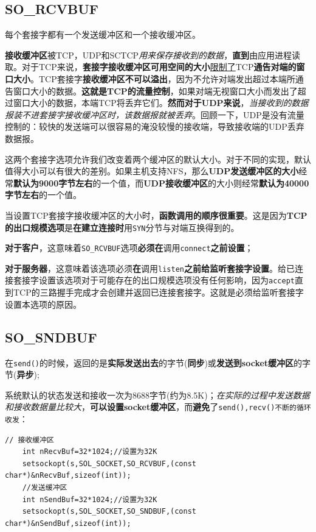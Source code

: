 \documentclass[UTF8,a4paper,8pt]{ctexbook}
\begin{document}
		\subsection{SO\_RCVBUF}
			每个套接字都有一个发送缓冲区和一个接收缓冲区。
			
			\textbf{接收缓冲区}被TCP，UDP和SCTCP\textit{用来保存接收到的数据}，\textbf{直到}由应用进程读取。对于TCP来说，\textbf{套接字接收缓冲区可用空间的大小}\underline{限制了}TCP\textbf{通告对端的窗口大小}。TCP套接字\textbf{接收缓冲区不可以溢出}，因为不允许对端发出超过本端所通告窗口大小的数据。\textbf{这就是TCP的流量控制}，如果对端无视窗口大小而发出了超过窗口大小的数据，本端TCP将丢弃它们。\textbf{然而对于UDP来说}，\textit{当接收到的数据报装不进套接字接收缓冲区时，该数据报就被丢弃}。回顾一下，UDP是没有流量控制的：较快的发送端可以很容易的淹没较慢的接收端，导致接收端的UDP丢弃数据报。
			
			这两个套接字选项允许我们改变着两个缓冲区的默认大小。对于不同的实现，默认值得大小可以有很大的差别。如果主机支持NFS，那么\textbf{UDP发送缓冲区的大小}经常\textbf{默认为9000字节左右}的一个值，而\textbf{UDP接收缓冲区}的大小则经常\textbf{默认为40000字节左右}的一个值。
			
			当设置TCP套接字接收缓冲区的大小时，\textbf{函数调用的顺序很重要}。这是因为\textbf{TCP的出口规模选项}是\textbf{在建立连接时}用\verb|SYN|分节与对端互换得到的。
			
			\textbf{对于客户}，这意味着\verb|SO_RCVBUF|选项\textbf{必须在}调用\verb|connect|\textbf{之前设置}；
			
			\textbf{对于服务器}，这意味着该选项必须\textbf{在}调用\verb|listen|\textbf{之前给监听套接字设置}。给已连接套接字设置该选项对于可能存在的出口规模选项没有任何影响，因为\verb|accept|直到TCP的三路握手完成才会创建并返回已连接套接字。这就是必须给监听套接字设置本选项的原因。
			
		\subsection{SO\_SNDBUF}
			在\verb|send()|的时候，返回的是\textbf{实际发送出去}的字节(\textbf{同步})或\textbf{发送到socket缓冲区}的字节(\textbf{异步});
			
			系统默认的状态发送和接收一次为8688字节(约为8.5K)；\textit{在实际的过程中发送数据和接收数据量比较大}，\textbf{可以设置socket缓冲区}，而\textbf{避免}了\verb|send(),recv()不断的循环收发|：
			
			\begin{lstlisting}[frame=L]
	// 接收缓冲区
	int nRecvBuf=32*1024;//设置为32K
	setsockopt(s,SOL_SOCKET,SO_RCVBUF,(const char*)&nRecvBuf,sizeof(int));
	//发送缓冲区
	int nSendBuf=32*1024;//设置为32K
	setsockopt(s,SOL_SOCKET,SO_SNDBUF,(const char*)&nSendBuf,sizeof(int));
		\end{lstlisting}
		
\end{document}

